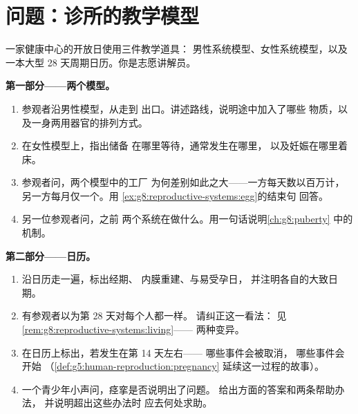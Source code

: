 \section{问题：诊所的教学模型}

\begin{problem}\label{pb:g8:reproductive-systems:1}
一家健康中心的开放日使用三件教学道具：
男性系统模型、女性系统模型，以及一本大型
28 天周期日历。你是志愿讲解员。

\medskip\noindent\textbf{第一部分——两个模型。}
\begin{enumerate}
  \item 参观者沿男性模型，从走到
        出口。讲述路线，说明途中加入了哪些
        物质，以及一身两用器官的排列方式。
  \item 在女性模型上，指出储备
        在哪里等待，通常发生在哪里，
        以及妊娠在哪里着床。
  \item 参观者问，两个模型中的工厂
        为何差别如此之大——一方每天数以百万计，
        另一方每月仅一个。用
        \cref{ex:g8:reproductive-systems:egg}的结束句
        回答。
  \item 另一位参观者问，之前
        两个系统在做什么。用一句话说明\cref{ch:g8:puberty}
        中的机制。
\end{enumerate}

\medskip\noindent\textbf{第二部分——日历。}
\begin{enumerate}[resume]
  \item 沿日历走一遍，标出经期、
        内膜重建、与易受孕日，
        并注明各自的大致日期。
  \item 有参观者以为第 28 天对每个人都一样。
        请纠正这一看法：
        见\cref{rem:g8:reproductive-systems:living}——
        两种变异。
  \item 在日历上标出，若发生在第 14 天左右——
        哪些事件会被取消，
        哪些事件会开始
        （\cref{def:g5:human-reproduction:pregnancy}
        延续这一过程的故事）。
  \item 一个青少年小声问，痉挛是否说明出了问题。
        给出方面的答案和两条帮助办法，
        并说明超出这些办法时
        应去何处求助。
\end{enumerate}


\end{problem}
